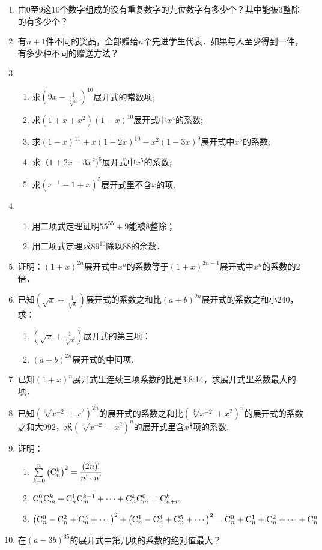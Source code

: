 \begin{enumerate}
\item 由0至9这10个数字组成的没有重复数字的九位数字有多少个？其中能被3整除的有多少个？
\item 有$n+1$件不同的奖品，全部赠给$n$个先进学生代表．如果每人至少得到一件，有多少种不同的赠送方法？
\item \begin{enumerate}[(1)]
    \item 求$\left(9x-\frac{1}{\sqrt[3]{x}}\right)^{10}$展开式的常数项;
    \item 求$(1+x+x^2)(1-x)^{10}$展开式中$x^4$的系数;
    \item 求$(1-x)^{11}+x(1-2x)^{10}-x^2(1-3x)^9$展开式中$x^5$的系数;
    \item 求$（1+2x-3x^2)^6$展开式中$x^5$的系数;
    \item 求$(x^{-1}-1+x)^5$展开式里不含$x$的项.
\end{enumerate}
\item \begin{enumerate}[(1)]
    \item 用二项式定理证明$55^{55}+9$能被8整除；
    \item 用二项式定理求$89^{10}$除以88的余数．
\end{enumerate}

\item 证明：$(1+x)^{2n}$展开式中$x^n$的系数等于$(1+x)^{2n-1}$展开式中$x^n$的系数的2倍．
\item 已知$\left(\sqrt{x}+\frac{1}{\sqrt[3]{x}}\right)$展开式的系数之和比$(a+b)^{2n}$展开式的系数之和小240，求：
\begin{enumerate}[(1)]
    \item $\left(\sqrt{x}+\frac{1}{\sqrt[3]{x}}\right)$展开式的第三项：
    \item $(a+b)^{2n}$展开式的中间项.
\end{enumerate}

\item 已知$(1+x)^n$展开式里连续三项系数的比是3:8:14，求展开式里系数最大的项．
\item 已知$\left(\sqrt[3]{x^{-2}}+x^2\right)^{2n}$的展开式的系数之和比$\left(\sqrt[3]{x^{-2}}+x^2\right)^{n}$的展开式的系数之和大992，求$\left(\sqrt[3]{x^{-2}}-x^2\right)^{n}$的展开式里含$x^{\tfrac{4}{3}}$项的系数.

\item 证明：
\begin{enumerate}[(1)]
    \item $\sum\limits^n_{k=0}\left({\rm C}^{k}_{n}\right)^2=\dfrac{(2n)!}{n!\cdot n!}$
    \item ${\rm C}^{0}_{n}{\rm C}^{k}_{m}+{\rm C}^{1}_{n}{\rm C}^{k-1}_{m}+\cdots+{\rm C}^{k}_{n}{\rm C}^{0}_{m}={\rm C}^{k}_{n+m}$
    \item $\left({\rm C}^{0}_{n}-{\rm C}^{2}_{n}+{\rm C}^{3}_{n}+\cdots\right)^2+ \left({\rm C}^{1}_{n}-{\rm C}^{3}_{n}+{\rm C}^{5}_{n}+\cdots\right)^2={\rm C}^{0}_{n}+{\rm C}^{1}_{n}+{\rm C}^{2}_{n}+\cdots+{\rm C}^{n}_{n}$
\end{enumerate}

\item 在$(a-3b)^{35}$的展开式中第几项的系数的绝对值最大？
\end{enumerate}

